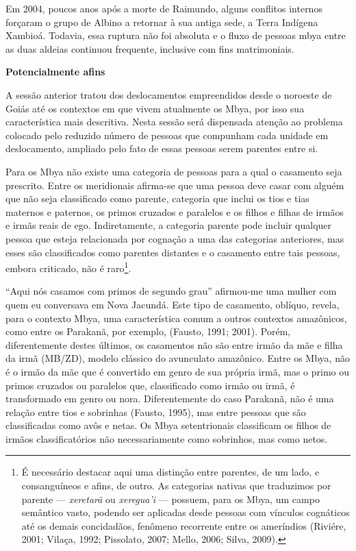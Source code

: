 Em 2004, poucos anos após a morte de Raimundo, alguns conflitos internos
forçaram o grupo de Albino a retornar à sua antiga sede, a Terra
Indígena Xambioá. Todavia, essa ruptura não foi absoluta e o fluxo de
pessoas mbya entre as duas aldeias continuou frequente, inclusive com
fins matrimoniais.

\textbf{Potencialmente afins}

A sessão anterior tratou dos deslocamentos empreendidos desde o noroeste
de Goiás até os contextos em que vivem atualmente os Mbya, por isso sua
característica mais descritiva. Nesta sessão será dispensada atenção ao
problema colocado pelo reduzido número de pessoas que compunham cada
unidade em deslocamento, ampliado pelo fato de essas pessoas serem
parentes entre si.

Para os Mbya não existe uma categoria de pessoas para a qual o casamento
seja prescrito. Entre os meridionais afirma-se que uma pessoa deve casar
com alguém que não seja classificado como parente, categoria que inclui
os tios e tias maternos e paternos, os primos cruzados e paralelos e os
filhos e filhas de irmãos e irmãs reais de ego. Indiretamente, a
categoria parente pode incluir qualquer pessoa que esteja relacionada
por cognação a uma das categorias anteriores, mas esses são
classificados como parentes distantes e o casamento entre tais pessoas,
embora criticado, não é raro\footnote{É necessário destacar aqui uma
  distinção entre parentes, de um lado, e consanguíneos e afins, de
  outro. As categorias nativas que traduzimos por parente ---
  \emph{xeretarã} ou \emph{xeregua'i} --- possuem, para os Mbya, um
  campo semântico vasto, podendo ser aplicadas desde pessoas com
  vínculos cognáticos até os demais concidadãos, fenômeno recorrente
  entre os ameríndios (Riviére, 2001; Vilaça, 1992; Pissolato, 2007;
  Mello, 2006; Silva, 2009).}.

``Aqui nós casamos com primos de segundo grau'' afirmou-me uma mulher
com quem eu conversava em Nova Jacundá. Este tipo de casamento, oblíquo,
revela, para o contexto Mbya, uma característica comum a outros
contextos amazônicos, como entre os Parakanã, por exemplo, (Fausto,
1991; 2001). Porém, diferentemente destes últimos, os casamentos não são
entre irmão da mãe e filha da irmã (MB/ZD), modelo clássico do
avunculato amazônico. Entre os Mbya, não é o irmão da mãe que é
convertido em genro de sua própria irmã, mas o primo ou primos cruzados
ou paralelos que, classificado como irmão ou irmã, é transformado em
genro ou nora. Diferentemente do caso Parakanã, não é uma relação entre
tios e sobrinhas (Fausto, 1995), mas entre pessoas que são classificadas
como avôs e netas. Os Mbya setentrionais classificam os filhos de irmãos
classificatórios não necessariamente como sobrinhos, mas como netos.

